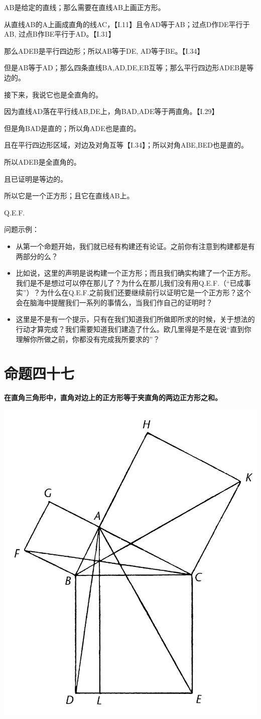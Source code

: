 \documentclass[
]{book}
\providecommand{\tightlist}{%
  \setlength{\itemsep}{0pt}\setlength{\parskip}{0pt}}
\begin{document}
AB是给定的直线；那么需要在直线AB上画正方形。

从直线AB的A上画成直角的线AC，【I.11】且令AD等于AB；过点D作DE平行于AB, 过点B作BE平行于AD。【I.31】

那么ADEB是平行四边形；所以AB等于DE, AD等于BE。【I.34】

但是AB等于AD；那么四条直线BA,AD,DE,EB互等；那么平行四边形ADEB是等边的。

接下来，我说它也是全直角的。

因为直线AD落在平行线AB,DE上，角BAD,ADE等于两直角。【I.29】

但是角BAD是直的；所以角ADE也是直的。

且在平行四边形区域，对边及对角互等【I.34】；所以对角ABE,BED也是直的。

所以ADEB是全直角的。

且已证明是等边的。

所以它是一个正方形；且它在直线AB上。

Q.E.F.

问题示例：

\begin{itemize}
\tightlist
\item
  从第一个命题开始，我们就已经有构建还有论证。之前你有注意到构建都是有两部分的么？
\item
  比如说，这里的声明是说构建一个正方形；而且我们确实构建了一个正方形。我们是不是想过可以停在那儿了？为什么在那儿我们没有用Q.E.F.（``已成事实''）？为什么在Q.E.F.之前我们还要继续前行以证明它是一个正方形？这个会在脑海中提醒我们一系列的事情么，当我们作自己的证明时？
\item
  这里是不是有一个提示，只有在我们知道我们所做即所求的时候，关于想法的行动才算完成？我们需要知道我们建造了什么。欧几里得是不是在说``直到你理解你所做之前，你都没有完成我所要求的''？
\end{itemize}

\hypertarget{ux547dux9898ux56dbux5341ux4e03}{%
\section{命题四十七}\label{ux547dux9898ux56dbux5341ux4e03}}

\textbf{在直角三角形中，直角对边上的正方形等于夹直角的两边正方形之和。}

\includegraphics[width=0.3\linewidth]{./image/img555}
\end{document}

